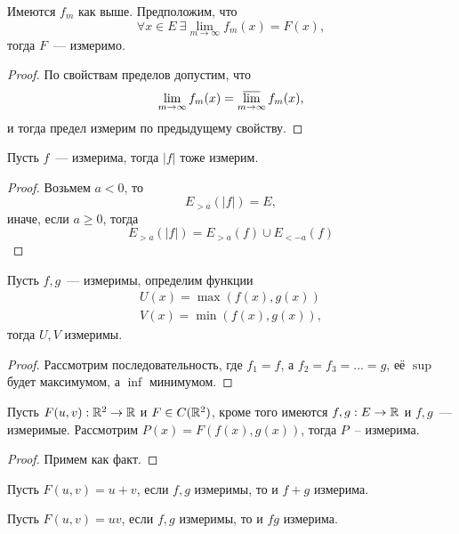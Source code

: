 \documentclass[main]{subfiles}
\begin{document}
\begin{property}
    Имеются $f_m$ как выше.
    Предположим, что
    \[\forall x\in E\  \exists \lim_{m \to \infty} f_m(x) = F(x),\]
    тогда $F$~--- измеримо.
\end{property}
\begin{proof}
    По свойствам пределов допустим, что
    \[\lim_{m \to \infty} f_m(x) = \varlimsup_{m \to \infty} f_m(x),\]
    и тогда предел измерим по предыдущему свойству.
\end{proof}

\begin{property}
    Пусть $f$~--- измерима, тогда $|f|$ тоже измерим.
\end{property}
\begin{proof}
    Возьмем $a < 0$, то
    \[E_{>a}(|f|) = E,\]
    иначе, если $a \ge 0$, тогда
    \[E_{>a}(|f|) = E_{>a} (f) \cup E_{< -a} (f)\]
\end{proof}

\begin{property}
    Пусть $f, g$~--- измеримы, определим функции
    \begin{gather*}
        U(x) = \max (f(x), g(x)) \\
        V(x) = \min (f(x), g(x)),
    \end{gather*}
    тогда $U, V$ измеримы.
\end{property}
\begin{proof}
    Рассмотрим последовательность, где $f_1 = f$, а $f_2 = f_3 = ... = g$, её $\sup$ будет максимумом, а $\inf$ минимумом.
\end{proof}

\begin{theorem}
    Пусть $F(u,v): \mathbb{R}^2 \to \mathbb{R}$ и $F\in C(\mathbb{R}^2)$, кроме того имеются $f, g: E \to \mathbb{R}$ и $f, g$~--- измеримые.
    Рассмотрим $P(x) = F(f(x), g(x))$, тогда $P$~-- измерима.
\end{theorem}
\begin{proof}
    Примем как факт.
\end{proof}

\begin{example}
    Пусть $F(u, v) = u + v$, если $f, g$ измеримы, то и $f+g$ измерима.
\end{example}
\begin{example}
    Пусть $F(u, v) = uv$, если $f, g$ измеримы, то и $fg$ измерима.
\end{example}
\end{document}
